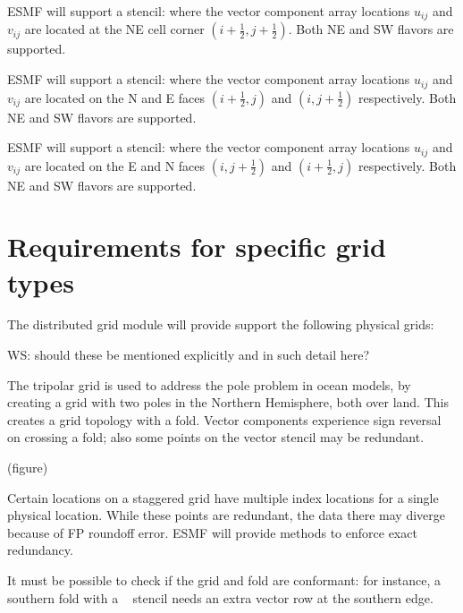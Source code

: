 ESMF will support a \bgrid stencil: where the vector component array
locations $u_{ij}$ and $v_{ij}$ are located at the NE cell corner
$(i+\frac12,j+\frac12)$. Both NE and SW flavors are supported.

\sreq{\cgrid}

ESMF will support a \cgrid stencil: where the vector component array
locations $u_{ij}$ and $v_{ij}$ are located on the N and E faces
$(i+\frac12,j)$ and $(i,j+\frac12)$ respectively. Both NE and SW
flavors are supported.

\sreq{\dgrid}

ESMF will support a \dgrid stencil: where the vector component array
locations $u_{ij}$ and $v_{ij}$ are located on the E and N faces
$(i,j+\frac12)$ and $(i+\frac12,j)$ respectively. Both NE and SW
flavors are supported.

\part{Requirements for specific grid types} \label{DG:gridtypes}

The distributed grid module will provide support the following 
physical grids:

WS: should these be mentioned explicitly and in such detail here?



The tripolar grid \cite{ref:m1996} is used to address the pole problem
in ocean models, by creating a grid with two poles in the Northern
Hemisphere, both over land. This creates a grid topology with a
fold. Vector components experience sign reversal on crossing a fold;
also some points on the vector stencil may be redundant.

(figure)



Certain locations on a staggered grid have multiple index locations
for a single physical location. While these points are redundant, the
data there may diverge because of FP roundoff error. ESMF will provide
methods to enforce exact redundancy.


It must be possible to check if the grid and fold are conformant:
for instance, a southern fold with a \bgrid~ stencil needs an extra
vector row at the southern edge.

